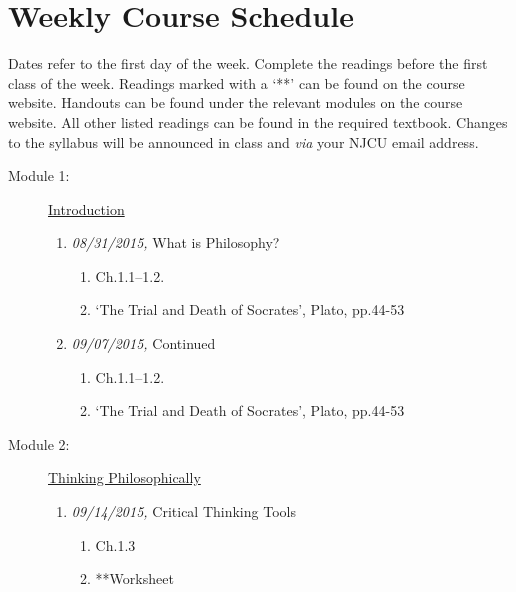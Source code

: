 \documentclass[article,oneside]{memoir}
\begin{document}
\section{Weekly Course Schedule}
Dates refer to the first day of the week. Complete the readings before the first class of the week. Readings marked with a `**' can be found on the course website. Handouts can be found under the relevant modules on the course website. All other listed readings can be found in the required textbook. Changes to the syllabus will be announced in class and \emph{via} your NJCU email address.

\begin{description}

\item[Module 1:] \href{http://scoconno.github.io/Teaching/Examined/Intro/}{Introduction}
\begin{enumerate}

\item \textit{08/31/2015,} What is Philosophy?
\begin{enumerate}
\item Ch.1.1--1.2. 
\item `The Trial and Death of Socrates', Plato, pp.44-53
\end{enumerate}



\item \textit{09/07/2015,} Continued

\begin{enumerate}
\item Ch.1.1--1.2.
\item `The Trial and Death of Socrates', Plato, pp.44-53
\end{enumerate}
\end{enumerate}



\item[Module 2:] \href{http://scoconno.github.io/Teaching/Examined/CT/}{Thinking Philosophically}
\begin{enumerate}

\item \textit{09/14/2015,} Critical Thinking Tools
\begin{enumerate}
\item Ch.1.3
\item **Worksheet
\end{enumerate}

\end{enumerate}


\end{description}
\end{document}
